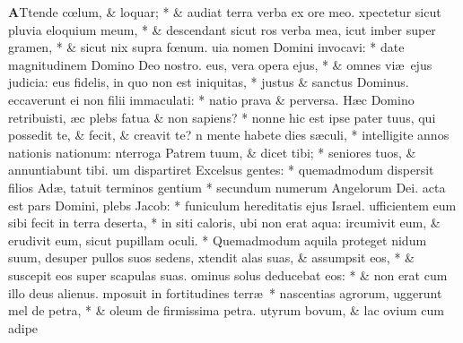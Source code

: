 \documentclass[letter,11pt]{book}
\begin{document}
\begin{multicols}{2}
\lettrine[lines=2]{\bfseries \color{Red} A}{}Ttende c\oe lum, \& loquar; * \& audiat terra verba ex ore meo.
xpectetur sicut pluvia eloquium meum, * \& descendant sicut ros verba mea,
icut imber super gramen, * \& sicut nix supra f\oe num.
uia nomen Domini invocavi: * date magnitudinem Domino Deo nostro.
eus, vera opera ejus, * \& omnes vi\ae \ ejus judicia:
eus fidelis, in quo non est iniquitas, * justus \& sanctus Dominus.
eccaverunt ei non filii immaculati: * natio prava \& perversa. H\ae c Domino retribuisti,
\ae c plebs fatua \& non sapiens? * nonne hic est ipse pater tuus, qui possedit te, \& fecit, \& creavit te?
n mente habete dies s\ae culi, * intelligite annos nationis nationum:
nterroga Patrem tuum, \& dicet tibi; * seniores tuos, \& annuntiabunt tibi.
um dispartiret Excelsus gentes: * quemadmodum dispersit filios Ad\ae ,
tatuit terminos gentium * secundum numerum Angelorum Dei.
acta est pars Domini, plebs Jacob: * funiculum hereditatis ejus Israel.
ufficientem eum sibi fecit in terra deserta, * in siti caloris, ubi non erat aqua:
ircumivit eum, \& erudivit eum, sicut pupillam oculi. * Quemadmodum aquila proteget nidum suum, desuper pullos suos sedens,
xtendit alas suas, \& assumpsit eos, * \& suscepit eos super scapulas suas.
ominus solus deducebat eos: * \& non erat cum illo deus alienus.
mposuit in fortitudines terr\ae \ * nascentias agrorum,
uggerunt mel de petra, * \& oleum de firmissima petra.
utyrum bovum, \& lac ovium cum adipe

\end{multicols}
\end{document}
